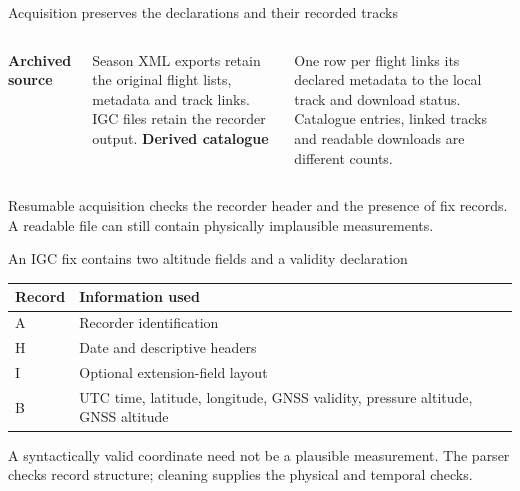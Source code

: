 \documentclass[11pt,aspectratio=169]{beamer}
\begin{document}
\begin{frame}{Acquisition preserves the declarations and their recorded tracks}
\begin{columns}[T,onlytextwidth]
\textbf{Archived source}\par\medskip
Season XML exports retain the original flight lists, metadata and track links.
IGC files retain the recorder output.
\textbf{Derived catalogue}\par\medskip
One row per flight links its declared metadata to the local track and download
status. Catalogue entries, linked tracks and readable downloads are different counts.
\end{columns}
\par\medskip
Resumable acquisition checks the recorder header and the presence of fix records.
A readable file can still contain physically implausible measurements.
\end{frame}

\begin{frame}{An IGC fix contains two altitude fields and a validity declaration}
\small
\begin{tabular}{@{}lp{10.8cm}@{}}\toprule
Record & Information used\\\midrule
A & Recorder identification\\
H & Date and descriptive headers\\
I & Optional extension-field layout\\
B & UTC time, latitude, longitude, GNSS validity, pressure altitude, GNSS altitude\\\bottomrule
\end{tabular}
\par\medskip
A syntactically valid coordinate need not be a plausible measurement. The parser checks
record structure; cleaning supplies the physical and temporal checks.
\end{frame}
\end{document}
